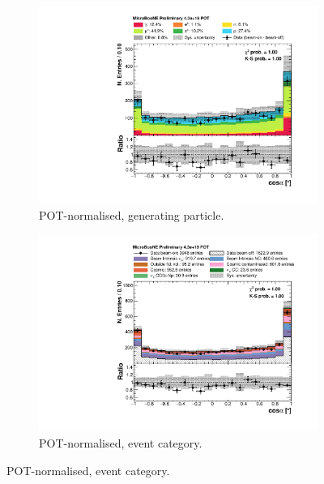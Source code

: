 \begin{figure}[htbp]
\centering
  \begin{subfigure}{0.49\textwidth}
    \includegraphics[width=\linewidth]{figures/h_track_shower_angle_pdg.pdf}
    \caption{POT-normalised, generating particle.} \label{fig:angle_pdg}
  \end{subfigure}
  \begin{subfigure}{0.49\textwidth}
    \includegraphics[width=\linewidth]{figures/h_track_shower_angle.pdf}
    \caption{POT-normalised, event category.} \label{fig:angle_pot}
  \end{subfigure}


\end{figure}

